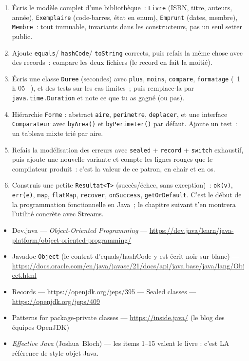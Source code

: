 \begin{exercice}
\begin{enumerate}
  \item \'Ecris le mod\`ele complet d'une biblioth\`eque~: \verb|Livre| (ISBN, titre, auteurs, ann\'ee),
        \verb|Exemplaire| (code-barres, \'etat en enum), \verb|Emprunt| (dates, membre),
        \verb|Membre|~: tout immuable, invariants dans les constructeurs, pas un seul setter public.
  \item Ajoute \verb|equals|/ \verb|hashCode|/ \verb|toString| corrects, puis refais la m\^eme
        chose avec des records~: compare les deux fichiers (le record en fait la moiti\'e).
  \item \'Ecris une classe \verb|Duree| (secondes) avec \verb|plus|, \verb|moins|, \verb|compare|,
        \verb|formatage| (\og ~1 h 05~ \fg{}), et des tests sur les cas limites~; puis remplace-la par
        \verb|java.time.Duration| et note ce que tu as gagn\'e (ou pas).
  \item Hi\'erarchie \verb|Forme| : abstract \verb|aire|, \verb|perimetre|, \verb|deplacer|, et une
        interface \verb|Comparateur| avec \verb|byArea()| et \verb|byPerimeter()| par d\'efaut.
        Ajoute un test~: un tableau mixte tri\'e par aire.
  \item Refais la mod\'elisation des erreurs avec \verb|sealed| + \verb|record| + \verb|switch|
        exhaustif, puis ajoute une nouvelle variante et compte les lignes rouges que le compilateur
        produit~: c'est la valeur de ce patron, en chair et en os.
  \item Construis une petite \verb|Resultat<T>| (succ\`es/\'echec, sans exception)~:
        \verb|ok(v)|, \verb|err(e)|, \verb|map|, \verb|flatMap|, \verb|recover|, \verb|onSuccess|,
        \verb|getOrDefault|. C'est le d\'ebut de la programmation fonctionnelle en Java~; le
        chapitre suivant t'en montrera l'utilit\'e concr\`ete avec Streams.
\end{enumerate}
\end{exercice}

\begin{ressources}
\begin{itemize}
  \item Dev.java --- \emph{Object-Oriented Programming} --- \url{https://dev.java/learn/java-platform/object-oriented-programming/}
  \item Javadoc \verb|Object| (le contrat d'equals/hashCode y est \'ecrit noir sur blanc) --- \url{https://docs.oracle.com/en/java/javase/21/docs/api/java.base/java/lang/Object.html}
  \item Records --- \url{https://openjdk.org/jeps/395} --- Sealed classes --- \url{https://openjdk.org/jeps/409}
  \item Patterns for package-private classes --- \url{https://inside.java/} (le blog des \'equipes OpenJDK)
  \item \emph{Effective Java} (Joshua~Bloch) --- les items 1--15 valent le livre : c'est LA r\'ef\'erence de style objet Java.
\end{itemize}
\end{ressources}

